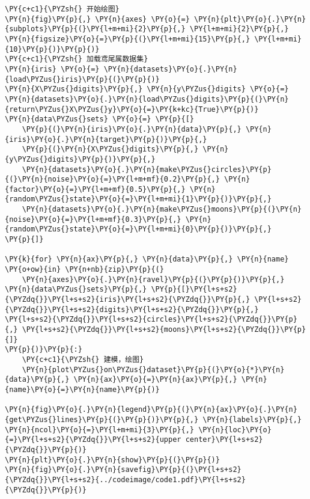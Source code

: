 \begin{Verbatim}[commandchars=\\\{\}]
\PY{c+c1}{\PYZsh{} 开始绘图}
\PY{n}{fig}\PY{p}{,} \PY{n}{axes} \PY{o}{=} \PY{n}{plt}\PY{o}{.}\PY{n}{subplots}\PY{p}{(}\PY{l+m+mi}{2}\PY{p}{,} \PY{l+m+mi}{2}\PY{p}{,} \PY{n}{figsize}\PY{o}{=}\PY{p}{(}\PY{l+m+mi}{15}\PY{p}{,} \PY{l+m+mi}{10}\PY{p}{)}\PY{p}{)}
\PY{c+c1}{\PYZsh{} 加载鸢尾属数据集}
\PY{n}{iris} \PY{o}{=} \PY{n}{datasets}\PY{o}{.}\PY{n}{load\PYZus{}iris}\PY{p}{(}\PY{p}{)}
\PY{n}{X\PYZus{}digits}\PY{p}{,} \PY{n}{y\PYZus{}digits} \PY{o}{=} \PY{n}{datasets}\PY{o}{.}\PY{n}{load\PYZus{}digits}\PY{p}{(}\PY{n}{return\PYZus{}X\PYZus{}y}\PY{o}{=}\PY{k+kc}{True}\PY{p}{)}
\PY{n}{data\PYZus{}sets} \PY{o}{=} \PY{p}{[}
    \PY{p}{(}\PY{n}{iris}\PY{o}{.}\PY{n}{data}\PY{p}{,} \PY{n}{iris}\PY{o}{.}\PY{n}{target}\PY{p}{)}\PY{p}{,}
    \PY{p}{(}\PY{n}{X\PYZus{}digits}\PY{p}{,} \PY{n}{y\PYZus{}digits}\PY{p}{)}\PY{p}{,}
    \PY{n}{datasets}\PY{o}{.}\PY{n}{make\PYZus{}circles}\PY{p}{(}\PY{n}{noise}\PY{o}{=}\PY{l+m+mf}{0.2}\PY{p}{,} \PY{n}{factor}\PY{o}{=}\PY{l+m+mf}{0.5}\PY{p}{,} \PY{n}{random\PYZus{}state}\PY{o}{=}\PY{l+m+mi}{1}\PY{p}{)}\PY{p}{,}
    \PY{n}{datasets}\PY{o}{.}\PY{n}{make\PYZus{}moons}\PY{p}{(}\PY{n}{noise}\PY{o}{=}\PY{l+m+mf}{0.3}\PY{p}{,} \PY{n}{random\PYZus{}state}\PY{o}{=}\PY{l+m+mi}{0}\PY{p}{)}\PY{p}{,}
\PY{p}{]}

\PY{k}{for} \PY{n}{ax}\PY{p}{,} \PY{n}{data}\PY{p}{,} \PY{n}{name} \PY{o+ow}{in} \PY{n+nb}{zip}\PY{p}{(}
    \PY{n}{axes}\PY{o}{.}\PY{n}{ravel}\PY{p}{(}\PY{p}{)}\PY{p}{,} \PY{n}{data\PYZus{}sets}\PY{p}{,} \PY{p}{[}\PY{l+s+s2}{\PYZdq{}}\PY{l+s+s2}{iris}\PY{l+s+s2}{\PYZdq{}}\PY{p}{,} \PY{l+s+s2}{\PYZdq{}}\PY{l+s+s2}{digits}\PY{l+s+s2}{\PYZdq{}}\PY{p}{,} \PY{l+s+s2}{\PYZdq{}}\PY{l+s+s2}{circles}\PY{l+s+s2}{\PYZdq{}}\PY{p}{,} \PY{l+s+s2}{\PYZdq{}}\PY{l+s+s2}{moons}\PY{l+s+s2}{\PYZdq{}}\PY{p}{]}
\PY{p}{)}\PY{p}{:}
    \PY{c+c1}{\PYZsh{} 建模，绘图}
    \PY{n}{plot\PYZus{}on\PYZus{}dataset}\PY{p}{(}\PY{o}{*}\PY{n}{data}\PY{p}{,} \PY{n}{ax}\PY{o}{=}\PY{n}{ax}\PY{p}{,} \PY{n}{name}\PY{o}{=}\PY{n}{name}\PY{p}{)}

\PY{n}{fig}\PY{o}{.}\PY{n}{legend}\PY{p}{(}\PY{n}{ax}\PY{o}{.}\PY{n}{get\PYZus{}lines}\PY{p}{(}\PY{p}{)}\PY{p}{,} \PY{n}{labels}\PY{p}{,} \PY{n}{ncol}\PY{o}{=}\PY{l+m+mi}{3}\PY{p}{,} \PY{n}{loc}\PY{o}{=}\PY{l+s+s2}{\PYZdq{}}\PY{l+s+s2}{upper center}\PY{l+s+s2}{\PYZdq{}}\PY{p}{)}
\PY{n}{plt}\PY{o}{.}\PY{n}{show}\PY{p}{(}\PY{p}{)}
\PY{n}{fig}\PY{o}{.}\PY{n}{savefig}\PY{p}{(}\PY{l+s+s2}{\PYZdq{}}\PY{l+s+s2}{../codeimage/code1.pdf}\PY{l+s+s2}{\PYZdq{}}\PY{p}{)}
\end{Verbatim}


